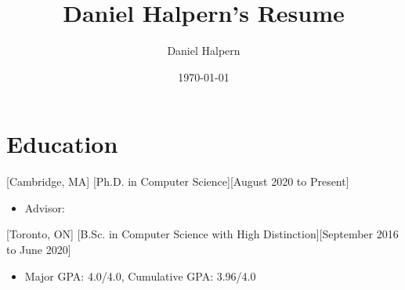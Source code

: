\documentclass{article}
\title{Daniel Halpern's Resume}
\author{Daniel Halpern}
\date{\today}
\newcommand{\link}[2]{\iftoggle{uselinks}{\href{#1}{#2}}{#2}\xspace}
\begin{document}

    \makecvtitle %

    \section{Education}

    [Cambridge, MA]
    [Ph.D. in Computer Science][August 2020 to Present]
    \begin{itemize}
        \item Advisor: \link{http://procaccia.info}{Ariel Procaccia}
    \end{itemize}

    [Toronto, ON]
    [B.Sc. in Computer Science with High Distinction][September 2016 to June 2020]
    \begin{itemize}
        \item Major GPA: 4.0/4.0, Cumulative GPA: 3.96/4.0
    \end{itemize}
\end{document}
